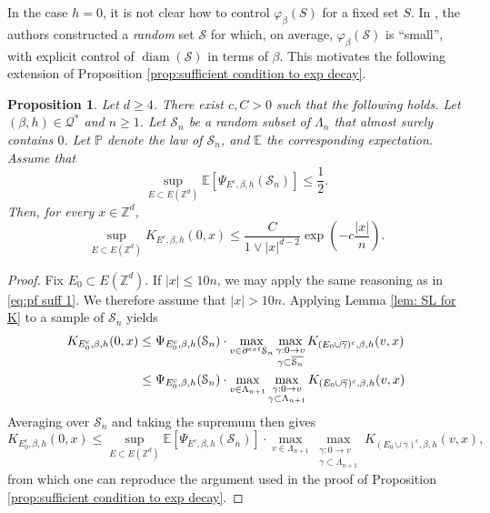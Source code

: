 \documentclass[10pt,a4paper]{amsart}
\numberwithin{equation}{section}
\newtheorem{Prop}[Thm]{Proposition}
\begin{document}
In the case $h=0$, it is not clear how to control $\varphi_\beta(S)$ for a fixed set $S$. In \cite{DuminilPanis2024newLB}, the authors constructed a \emph{random} set $\mathcal S$ for which, on average, $\varphi_\beta(\mathcal S)$ is ``small'', with explicit control of $\operatorname{diam}(\mathcal S)$ in terms of $\beta$. This motivates the following extension of Proposition \ref{prop:sufficient condition to exp decay}. 



\begin{Prop}\label{prop:sufficient condition to exp decay random} Let $d\geq 4$. There exist $c,C>0$ such that the following holds. Let $(\beta,h)\in \mathcal Q^*$ and $n \geq 1$. Let $\mathcal S_n$ be a random subset of $\Lambda_n$ that almost surely contains $0$. Let $\mathbb{P}$ denote the law of $\mathcal{S}_n$, and $\mathbb{E}$ the corresponding expectation. Assume that 
\begin{equation}\label{eq: random assumption to get exp decay}
	\sup_{E\subset E(\mathbb Z^d)}\mathbb E[\Psi_{E^c,\beta,h}(\mathcal S_n)]\leq \frac{1}{2}.
\end{equation}
Then, for every $x\in \mathbb Z^d$,
\begin{equation}
	\sup_{E\subset E(\mathbb Z^d)}K_{E^c,\beta,h}(0,x)\leq \frac{C}{1\vee |x|^{d-2}}\exp\left(-c\frac{|x|}{n}\right).
\end{equation}
\end{Prop}

\begin{proof} Fix $E_0\subset E(\mathbb Z^d)$. If $|x|\leq 10n$, we may apply the same reasoning as in \eqref{eq:pf suff 1}. We therefore assume that $|x|>10n$.  Applying Lemma \ref{lem: SL for K} to a sample of $\mathcal S_n$ yields
\begin{align}
\begin{aligned}
	K_{E_0^c,\beta,h}(0,x)&\leq \Psi_{E_0^c,\beta,h}(\mathcal S_n)\cdot \max_{v\in \partial^{\textup{ext}}\mathcal S_n}\max_{\substack{\gamma:0\rightarrow v\\\gamma\subset\overline{\mathcal S_n}}}K_{(E_0\cup\overline{\gamma})^c,\beta,h}(v,x)\\&\leq  \Psi_{E_0^c,\beta,h}(\mathcal S_n)\cdot \max_{v\in \Lambda_{n+1}}\max_{\substack{\gamma:0\rightarrow v\\\gamma\subset\Lambda_{n+1}}}K_{(E_0\cup\overline{\gamma})^c,\beta,h}(v,x)
	\end{aligned}
\end{align}
Averaging over $\mathcal S_n$ and taking the supremum then gives
\begin{equation}
	K_{E_0^c,\beta,h}(0,x)\leq \sup_{E\subset E(\mathbb Z^d)}\mathbb E[\Psi_{E^c,\beta,h}(\mathcal S_n)]\cdot \max_{v\in \Lambda_{n+1}}\max_{\substack{\gamma:0\rightarrow v\\\gamma\subset\Lambda_{n+1}}}K_{(E_0\cup\overline{\gamma})^c,\beta,h}(v,x),
\end{equation}
from which one can reproduce the argument used in the proof of Proposition \ref{prop:sufficient condition to exp decay}.
\end{proof}
\end{document}
